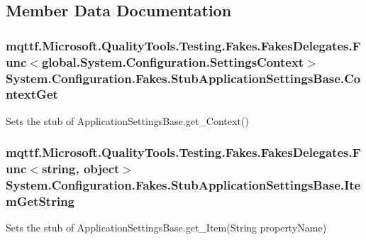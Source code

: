\subsection{Member Data Documentation}
\hypertarget{class_system_1_1_configuration_1_1_fakes_1_1_stub_application_settings_base_ae4385141162d1f5478e86fe0d383a5bb}{
\subsubsection[{Context\-Get}]{\setlength{\rightskip}{0pt plus 5cm}mqttf.\-Microsoft.\-Quality\-Tools.\-Testing.\-Fakes.\-Fakes\-Delegates.\-Func$<$global.\-System.\-Configuration.\-Settings\-Context$>$ System.\-Configuration.\-Fakes.\-Stub\-Application\-Settings\-Base.\-Context\-Get}}\label{class_system_1_1_configuration_1_1_fakes_1_1_stub_application_settings_base_ae4385141162d1f5478e86fe0d383a5bb}


Sets the stub of Application\-Settings\-Base.\-get\-\_\-\-Context()

\hypertarget{class_system_1_1_configuration_1_1_fakes_1_1_stub_application_settings_base_a1247b79fb6324a0b76c3d733f56b0f4e}{
\subsubsection[{Item\-Get\-String}]{\setlength{\rightskip}{0pt plus 5cm}mqttf.\-Microsoft.\-Quality\-Tools.\-Testing.\-Fakes.\-Fakes\-Delegates.\-Func$<$string, object$>$ System.\-Configuration.\-Fakes.\-Stub\-Application\-Settings\-Base.\-Item\-Get\-String}}\label{class_system_1_1_configuration_1_1_fakes_1_1_stub_application_settings_base_a1247b79fb6324a0b76c3d733f56b0f4e}


Sets the stub of Application\-Settings\-Base.\-get\-\_\-\-Item(\-String property\-Name)

